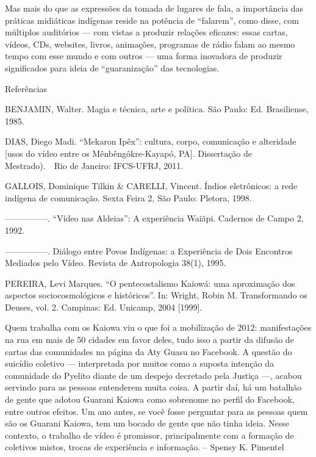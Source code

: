 \documentclass{article}
\begin{document}
Mas mais do que as express\~oes da tomada de lugares de fala, a
import\^ancia das pr\'aticas midi\'aticas ind\'igenas reside na
pot\^encia de {\textquotedblleft}falarem{\textquotedblright}, como
disse, com m\'ultiplos audit\'orios --- com vistas a produzir
rela\c{c}\~oes eficazes: essas cartas, v\'ideos, CDs, websites, livros,
anima\c{c}\~oes, programas de r\'adio falam ao mesmo tempo com esse
mundo e com outros --- uma forma inovadora de produzir significados
para ideia de {\textquotedblleft}guaraniza\c{c}\~ao{\textquotedblright}
das tecnologias.

Refer\^encias\ \  \ \ 

BENJAMIN, Walter. Magia e t\'ecnica, arte e pol\'itica. S\~ao Paulo: Ed.
Brasiliense, 1985.

DIAS, Diego Madi. {\textquotedblleft}Mekaron Ip\^ex{\textquotedblright}:
cultura, corpo, comunica\c{c}\~ao e alteridade [usos do v\'ideo entre
os M\^enb\^eng\^okre-Kayap\'o, PA]. Disserta\c{c}\~ao de
Mestrado).\ \ Rio de Janeiro: IFCS-UFRJ, 2011. 

GALLOIS, Dominique Tilkin \& CARELLI, Vincent. \'Indios eletr\^onicos: a
rede ind\'igena de comunica\c{c}\~ao.  Sexta Feira 2, S\~ao Paulo:
Pletora, 1998. 

{}---{}---{}---{}---{}---. {\textquotedblleft}V\'ideo nas
Aldeias{\textquotedblright}: A experi\^encia Wai\~api. Cadernos de
Campo 2, 1992.

{}---{}---{}---{}---{}---. Di\'alogo entre Povos Ind\'igenas: a
Experi\^encia de Dois Encontros Mediados pelo V\'ideo. Revista de
Antropologia 38(1), 1995.

PEREIRA, Levi Marques. {\textquotedblleft}O pentecostalismo Kaiow\'a:
uma aproxima\c{c}\~ao dos aspectos sociocosmol\'ogicos e
hist\'oricos{\textquotedblright}. In: Wright, Robin M. Transformando os
Deuses, vol. 2. Campinas: Ed. Unicamp, 2004 [1999].

Quem trabalha com os Kaiowa viu o que foi a mobiliza\c{c}\~ao de 2012:
manifesta\c{c}\~oes na rua em mais de 50 cidades em favor deles, tudo
isso a partir da difus\~ao de cartas das comunidades na p\'agina da Aty
Guasu no Facebook. A quest\~ao do suic\'idio coletivo --- interpretada
por muitos como a suposta inten\c{c}\~ao da comunidade do Pyelito
diante de um despejo decretado pela Justi\c{c}a ---, acabou servindo
para as pessoas entenderem muita coisa. A partir da\'i, h\'a um
batalh\~ao de gente que adotou Guarani Kaiowa como sobrenome no perfil
do Facebook, entre outros efeitos. Um ano antes, se voc\^e fosse
perguntar para as pessoas quem s\~ao os Guarani Kaiowa, tem um bocado
de gente que n\~ao tinha ideia. Nesse contexto, o trabalho de v\'ideo
\'e promissor, principalmente com a forma\c{c}\~ao de coletivos mistos,
trocas de experi\^encia e informa\c{c}\~ao. -- Spensy K. Pimentel 
\end{document}
